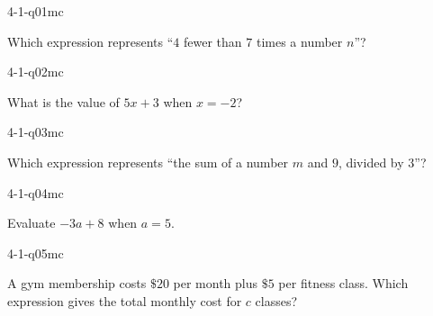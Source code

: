 

\begin{practiceQuestion}{4-1-q01}{mc}
\begin{questionText}
Which expression represents ``$4$ fewer than $7$ times a number $n$''?
\end{questionText}
\end{practiceQuestion}

\begin{practiceQuestion}{4-1-q02}{mc}
\begin{questionText}
What is the value of $5x + 3$ when $x = -2$?
\end{questionText}
\end{practiceQuestion}

\begin{practiceQuestion}{4-1-q03}{mc}
\begin{questionText}
Which expression represents ``the sum of a number $m$ and $9$, divided by $3$''?
\end{questionText}
\end{practiceQuestion}

\begin{practiceQuestion}{4-1-q04}{mc}
\begin{questionText}
Evaluate $-3a + 8$ when $a = 5$.
\end{questionText}
\end{practiceQuestion}

\begin{practiceQuestion}{4-1-q05}{mc}
\begin{questionText}
A gym membership costs $\$20$ per month plus $\$5$ per fitness class. Which expression gives the total monthly cost for $c$ classes?
\end{questionText}
\end{practiceQuestion}


